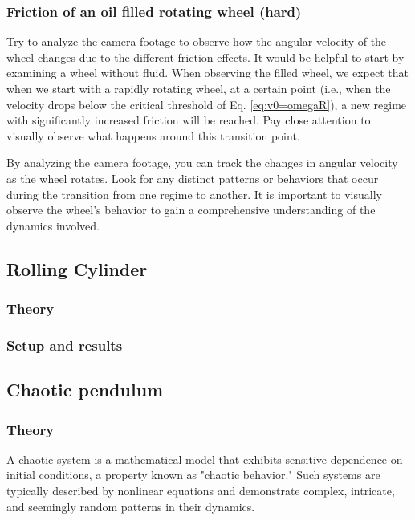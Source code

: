 \documentclass{article}
\begin{document}
\subsubsection{Friction of an oil filled rotating wheel (hard)}
Try to analyze the camera footage to observe how the angular velocity of the wheel changes due to the different friction effects. It would be helpful to start by examining a wheel without fluid. When observing the filled wheel, we expect that when we start with a rapidly rotating wheel, at a certain point (i.e., when the velocity drops below the critical threshold of Eq. \ref{eq:v0=omegaR}), a new regime with significantly increased friction will be reached. Pay close attention to visually observe what happens around this transition point.

By analyzing the camera footage, you can track the changes in angular velocity as the wheel rotates. Look for any distinct patterns or behaviors that occur during the transition from one regime to another. It is important to visually observe the wheel's behavior to gain a comprehensive understanding of the dynamics involved.



\newpage

\subsection{Rolling Cylinder}
\subsubsection{Theory}
\subsubsection{Setup and results}

\newpage

\subsection{Chaotic pendulum}
\subsubsection{Theory}
A chaotic system is a mathematical model that exhibits sensitive dependence on initial conditions, a property known as "chaotic behavior." Such systems are typically described by nonlinear equations and demonstrate complex, intricate, and seemingly random patterns in their dynamics. 
\end{document}

